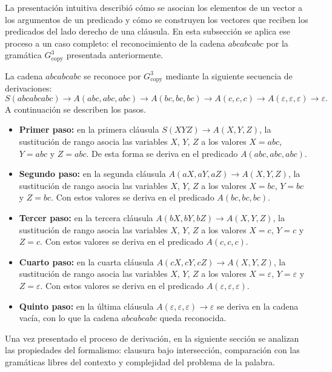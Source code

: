 \documentclass{report}
\theoremstyle{definition}
\theoremstyle{plain}
\theoremstyle{remark}
\begin{document}
La presentación intuitiva describió cómo se asocian los elementos de
un vector a los argumentos de un predicado y cómo se construyen los
vectores que reciben los predicados del lado derecho de una cláusula.
En esta subsección se aplica ese proceso a un caso completo: el
reconocimiento de la cadena $abcabcabc$ por la gramática
$G_{\mathrm{copy}}^3$ presentada anteriormente.

La cadena $abcabcabc$ se reconoce por $G_{\mathrm{copy}}^3$ mediante
la siguiente secuencia de derivaciones:
\[
  S(abcabcabc) \to A(abc, abc, abc) \to A(bc, bc, bc) \to A(c, c, c)
  \to A(\varepsilon, \varepsilon, \varepsilon) \to \varepsilon.
\]
A continuación se describen los pasos.
\begin{itemize}
  \item \textbf{Primer paso:} en la primera cláusula
        $S(XYZ) \to A(X, Y, Z)$, la sustitución de rango asocia las
        variables $X$, $Y$, $Z$ a los valores $X = abc$, $Y = abc$ y
        $Z = abc$. De esta forma se deriva en el predicado $A(abc, abc,
          abc)$.
  \item \textbf{Segundo paso:} en la segunda cláusula
        $A(aX, aY, aZ) \to A(X, Y, Z)$, la sustitución de rango asocia las
        variables $X$, $Y$, $Z$ a los valores $X = bc$, $Y = bc$ y
        $Z = bc$. Con estos valores se deriva en el predicado
        $A(bc, bc, bc)$.
  \item \textbf{Tercer paso:} en la tercera cláusula
        $A(bX, bY, bZ) \to A(X, Y, Z)$, la sustitución de rango asocia las
        variables $X$, $Y$, $Z$ a los valores $X = c$, $Y = c$ y $Z = c$.
        Con estos valores se deriva en el predicado $A(c, c, c)$.
  \item \textbf{Cuarto paso:} en la cuarta cláusula
        $A(cX, cY, cZ) \to A(X, Y, Z)$, la sustitución de rango asocia las
        variables $X$, $Y$, $Z$ a los valores $X = \varepsilon$,
        $Y = \varepsilon$ y $Z = \varepsilon$. Con estos valores se deriva
        en el predicado $A(\varepsilon, \varepsilon, \varepsilon)$.
  \item \textbf{Quinto paso:} en la última cláusula
        $A(\varepsilon, \varepsilon, \varepsilon) \to \varepsilon$ se deriva
        en la cadena vacía, con lo que la cadena $abcabcabc$ queda
        reconocida.
\end{itemize}

Una vez presentado el proceso de derivación, en la siguiente sección se
analizan las propiedades del formalismo: clausura bajo intersección,
comparación con las gramáticas libres del contexto y complejidad del
problema de la palabra.
\end{document}
